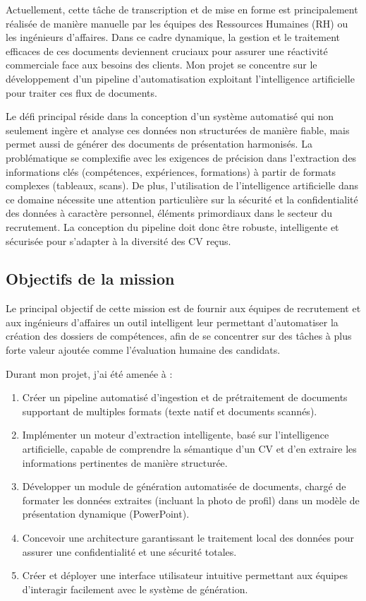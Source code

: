 Actuellement, cette tâche de transcription et de mise en forme est principalement réalisée de manière manuelle par les équipes des Ressources Humaines (RH) ou les ingénieurs d'affaires. Dans ce cadre dynamique, la gestion et le traitement efficaces de ces documents deviennent cruciaux pour assurer une réactivité commerciale face aux besoins des clients. Mon projet se concentre sur le développement d'un pipeline d'automatisation exploitant l'intelligence artificielle pour traiter ces flux de documents.

Le défi principal réside dans la conception d'un système automatisé qui non seulement ingère et analyse ces données non structurées de manière fiable, mais permet aussi de générer des documents de présentation harmonisés. La problématique se complexifie avec les exigences de précision dans l'extraction des informations clés (compétences, expériences, formations) à partir de formats complexes (tableaux, scans). De plus, l'utilisation de l'intelligence artificielle dans ce domaine nécessite une attention particulière sur la sécurité et la confidentialité des données à caractère personnel, éléments primordiaux dans le secteur du recrutement. La conception du pipeline doit donc être robuste, intelligente et sécurisée pour s'adapter à la diversité des CV reçus.

\subsection{Objectifs de la mission}
Le principal objectif de cette mission est de fournir aux équipes de recrutement et aux ingénieurs d'affaires un outil intelligent leur permettant d'automatiser la création des dossiers de compétences, afin de se concentrer sur des tâches à plus forte valeur ajoutée comme l'évaluation humaine des candidats.

Durant mon projet, j'ai été amenée à :
\begin{enumerate}
    \item Créer un pipeline automatisé d'ingestion et de prétraitement de documents supportant de multiples formats (texte natif et documents scannés).
    \item Implémenter un moteur d'extraction intelligente, basé sur l'intelligence artificielle, capable de comprendre la sémantique d'un CV et d'en extraire les informations pertinentes de manière structurée.
    \item Développer un module de génération automatisée de documents, chargé de formater les données extraites (incluant la photo de profil) dans un modèle de présentation dynamique (PowerPoint).
    \item Concevoir une architecture garantissant le traitement local des données pour assurer une confidentialité et une sécurité totales.
    \item Créer et déployer une interface utilisateur intuitive permettant aux équipes d'interagir facilement avec le système de génération.
\end{enumerate}

